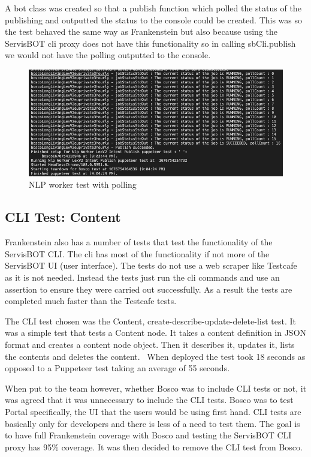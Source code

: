 \documentclass[12pt,a4paper,titlepage]{report}
\begin{document}
A bot class was created so that a publish function which polled the status of the publishing and outputted the status to the console could be created. This was so 
the test behaved the same way as Frankenstein but also because using the ServisBOT cli proxy does not have this functionality so in calling sbCli.publish we would 
not have the polling outputted to the console.

\begin{figure}[H]
 \centering
 \includegraphics[width=15cm]{./diagrams/nlp_worker_poll.png}
 \caption{NLP worker test with polling}
\end{figure}

\subsection{CLI Test: Content}
Frankenstein also has a number of tests that test the functionality of the ServisBOT CLI. The cli has most of the functionality if not more of the ServisBOT UI (user interface). The tests do not use a web scraper like Testcafe as it is not needed. 
Instead the tests just run the cli commands and use an assertion to ensure they were carried out successfully. As a result the tests are completed much faster than the Testcafe tests.

The CLI test chosen was the Content, create-describe-update-delete-list test. It was a simple test that tests a Content node. It takes a content definition in JSON format and creates a content node object. Then it describes it, updates it, lists the contents and deletes the content. 
When deployed the test took 18 seconds as opposed to a Puppeteer test taking an average of 55 seconds.

When put to the team however, whether Bosco was to include CLI tests or not, it was agreed that it was unnecessary to include the CLI tests. Bosco was to test Portal specifically, the UI that the users would 
be using first hand. CLI tests are basically only for developers and there is less of a need to test them. The goal is to have full Frankenstein coverage with Bosco and testing the ServisBOT CLI proxy has 95\% coverage. 
It was then decided to remove the CLI test from Bosco. 
\end{document}
